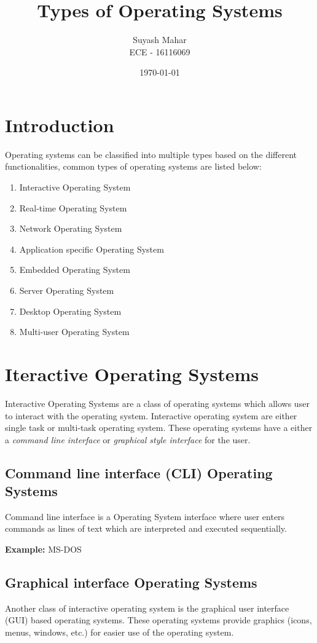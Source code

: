 \documentclass[a4,11pt]{article}
\title{Types of Operating Systems}
\author{Suyash Mahar \\
            ECE - 16116069
}
\date{\today}
\begin{document}
\maketitle

\begin{multicols}{2}
  
  \section{Introduction}
  Operating systems can be classified into multiple types based on the
  different functionalities, common types of operating systems are
  listed below:
  \begin{enumerate}
  \item Interactive Operating System
  \item Real-time Operating System
  \item Network Operating System
  \item Application specific Operating System
  \item Embedded Operating System
  \item Server Operating System
  \item Desktop Operating System
  \item Multi-user Operating System
  \end{enumerate}
  \section{Iteractive Operating Systems}
  Interactive Operating Systems are a class of operating systems which
  allows user to interact with the operating system. Interactive
  operating system are either single task or multi-task operating
  system. These operating systems have a either a \textit{command line
    interface} or \textit{graphical style interface} for the user.
  \subsection{Command line interface (CLI) Operating Systems}
  Command line interface is a Operating System interface where user
  enters commands as lines of text which are interpreted and executed
  sequentially.

  \textbf{Example:} MS-DOS

  \subsection{Graphical interface Operating Systems}
  Another class of interactive operating system is the graphical user
  interface (GUI) based operating systems. These operating systems
  provide graphics (icons, menus, windows, etc.) for easier use of the
  operating system.


\end{multicols}
\end{document}
